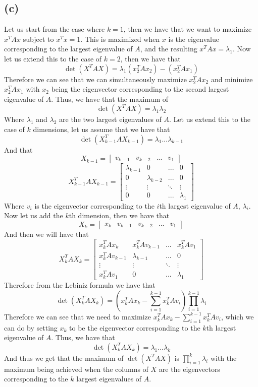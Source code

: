 \documentclass[11pt]{article}
\begin{document}
\subsection*{(c)}
Let us start from the case where $k=1$, then we have that we want to 
maximize $x^TAx$ subject to $x^Tx=1$. This is maximized when $x$ is the 
eigenvalue corresponding to the largest eigenvalue of $A$, and the resulting 
$x^TAx=\lambda_1$. Now let us extend this to the case of $k=2$, then we have that 
$$\det(X^TAX)=\lambda_1(x_{2}^TAx_{2})-(x_{2}^TAx_{1})$$
Therefore we can see that we can simultaneously maximize $x_{2}^TAx_{2}$
and minimize $x_{2}^TAx_{1}$ with $x_{2}$ being the eigenvector corresponding to the second largest eigenvalue of $A$. Thus, we have that the maximum of
$$\det(X^TAX)=\lambda_1\lambda_2$$
Where $\lambda_1$ and $\lambda_2$ are the two largest eigenvalues of $A$. Let us 
extend this to the case of $k$ dimensions, let us assume that we have that
$$\det(X_{k-1}^TAX_{k-1})=\lambda_1...\lambda_{k-1}$$
And that 
$$X_{k-1} = \begin{bmatrix}
v_{k-1} & v_{k-2} & ... & v_1
\end{bmatrix}$$
$$X_{k-1}^TAX_{k-1} = \begin{bmatrix}
    \lambda_{k-1} & 0 & ... & 0\\
    0 & \lambda_{k-2} & ... & 0\\
    \vdots & \vdots & \ddots & \vdots\\
    0 & 0 & ... & \lambda_1
\end{bmatrix}$$
Where $v_i$ is the eigenvector corresponding to the $i$th largest eigenvalue of $A$, $\lambda_i$. Now let us add the $k$th dimension, then we have that
$$X_{k} = \begin{bmatrix}
    x_{k} & v_{k-1} & v_{k-2} & ... & v_1
\end{bmatrix}$$
And then we will have that 
$$X_{k}^TAX_{k} = \begin{bmatrix}
    x_{k}^TAx_{k} & x_{k}^TAv_{k-1} &... & x_{k}^TAv_1\\
    x_{k}^TAv_{k-1} & \lambda_{k-1} & ... & 0\\
    \vdots & \vdots & \ddots & \vdots\\
    x_{k}^TAv_1 & 0 & ... & \lambda_1
\end{bmatrix}$$
Therefore from the Lebiniz formula we have that 
$$\det(X_{k}^TAX_{k})=\left(x_{k}^TAx_{k}-\sum_{i=1}^{k-1}x_{k}^TAv_i\right)
\prod_{i=1}^{k-1}\lambda_i$$
Therefore we can see that we need to maximize $x_{k}^TAx_{k}-\sum_{i=1}^{k-1}x_{k}^TAv_i$, which 
we can do by setting $x_{k}$ to be the eigenvector corresponding to the $k$th largest eigenvalue of $A$. Thus, we have that
$$\det(X_{k}^TAX_{k})=\lambda_1...\lambda_{k}$$
And thus we get that the maximum of $\det(X^TAX)$ is $\prod_{i=1}^{k}\lambda_i$
with the maximum being achieved when the columns of $X$ are the eigenvectors corresponding to the $k$ largest eigenvalues of $A$.
\end{document}
